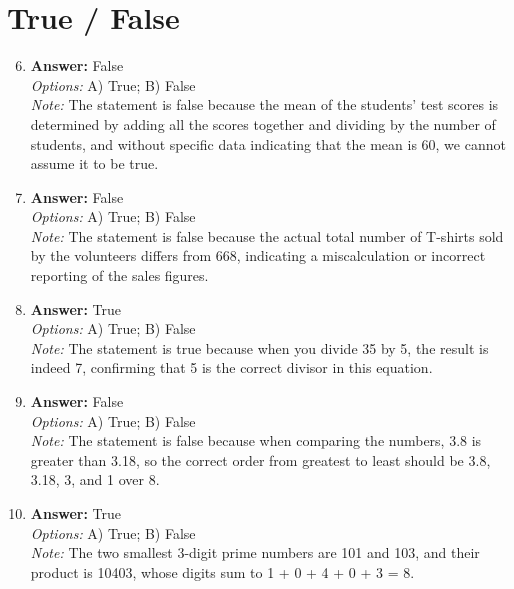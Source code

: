 \documentclass[12pt]{article}
\begin{document}
\section*{True / False}
\begin{enumerate}[label=\arabic*.]
\setcounter{enumi}{5}
\item \textbf{Answer:} False
\\ \textit{Options:} A) True; B) False
\\ \textit{Note:} The statement is false because the mean of the students' test scores is determined by adding all the scores together and dividing by the number of students, and without specific data indicating that the mean is 60, we cannot assume it to be true.
\item \textbf{Answer:} False
\\ \textit{Options:} A) True; B) False
\\ \textit{Note:} The statement is false because the actual total number of T-shirts sold by the volunteers differs from 668, indicating a miscalculation or incorrect reporting of the sales figures.
\item \textbf{Answer:} True
\\ \textit{Options:} A) True; B) False
\\ \textit{Note:} The statement is true because when you divide 35 by 5, the result is indeed 7, confirming that 5 is the correct divisor in this equation.
\item \textbf{Answer:} False
\\ \textit{Options:} A) True; B) False
\\ \textit{Note:} The statement is false because when comparing the numbers, 3.8 is greater than 3.18, so the correct order from greatest to least should be 3.8, 3.18, 3, and 1 over 8.
\item \textbf{Answer:} True
\\ \textit{Options:} A) True; B) False
\\ \textit{Note:} The two smallest 3-digit prime numbers are 101 and 103, and their product is 10403, whose digits sum to 1 + 0 + 4 + 0 + 3 = 8.
\end{enumerate}
\end{document}
